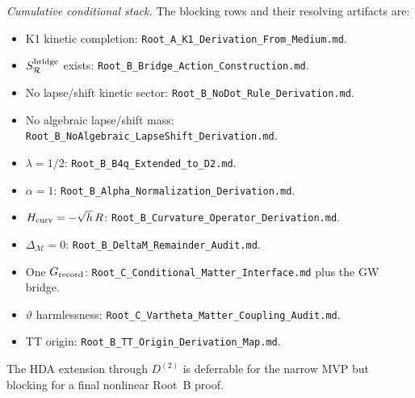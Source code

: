 \documentclass[11pt]{article}
\begin{document}
\medskip\noindent\textit{Cumulative conditional stack.}
The blocking rows and their resolving artifacts are:
\begin{itemize}
\item K1 kinetic completion:
  \texttt{Root\_A\_K1\_Derivation\_From\_Medium.md}.
\item \(S_{\mathcal R}^{\rm bridge}\) exists:
  \texttt{Root\_B\_Bridge\_Action\_Construction.md}.
\item No lapse/shift kinetic sector:
  \texttt{Root\_B\_NoDot\_Rule\_Derivation.md}.
\item No algebraic lapse/shift mass:
  \texttt{Root\_B\_NoAlgebraic\_LapseShift\_Derivation.md}.
\item \(\lambda=1/2\):
  \texttt{Root\_B\_B4q\_Extended\_to\_D2.md}.
\item \(\alpha=1\):
  \texttt{Root\_B\_Alpha\_Normalization\_Derivation.md}.
\item \(H_{\rm curv}=-\sqrt h\,R\):
  \texttt{Root\_B\_Curvature\_Operator\_Derivation.md}.
\item \(\Delta_{\mathcal M}=0\):
  \texttt{Root\_B\_DeltaM\_Remainder\_Audit.md}.
\item One \(G_{\rm record}\):
  \texttt{Root\_C\_Conditional\_Matter\_Interface.md} plus the GW bridge.
\item \(\vartheta\) harmlessness:
  \texttt{Root\_C\_Vartheta\_Matter\_Coupling\_Audit.md}.
\item TT origin:
  \texttt{Root\_B\_TT\_Origin\_Derivation\_Map.md}.
\end{itemize}
The HDA extension through \(D^{(2)}\) is deferrable for the narrow MVP but
blocking for a final nonlinear Root~B proof.
\end{document}
